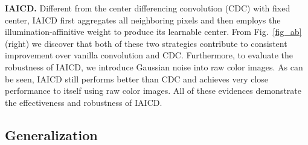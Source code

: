 \documentclass{article}
\begin{document}
\textbf{IAICD.} Different from the center differencing convolution (CDC) \cite{yu2020searching} with fixed center, IAICD first aggregates all neighboring pixels and then employs the illumination-affinitive weight to produce its learnable center. From Fig.~\ref{fig_ab} (right) we discover that both of these two strategies contribute to consistent improvement over vanilla convolution and CDC. Furthermore, to evaluate the robustness of IAICD, we introduce Gaussian noise into raw color images. As can be seen, IAICD still performs better than CDC and achieves very close performance to itself using raw color images. All of these evidences demonstrate the effectiveness and robustness of IAICD. 



\subsection{Generalization}

\begin{table}
\vspace{-18pt}
\centering
\caption{Results on \href{http://www.cvlibs.net/datasets/kitti/eval_depth.php?benchmark=depth_completion}{KITTI depth completion benchmark}.}
\vspace{1pt}
\label{tab_gc_ldcnet}
\vspace{-13pt}
\end{table}
\end{document}
